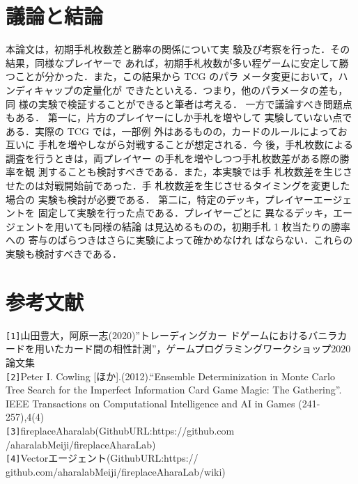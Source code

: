 \documentclass[twocolumn]{ltjsarticle}
\begin{document}
\section{議論と結論}
\small{
  本論文は，初期手札枚数差と勝率の関係について実
験及び考察を行った．その結果，同様なプレイヤーで
あれば，初期手札枚数が多い程ゲームに安定して勝
つことが分かった．また，この結果から TCG のパラ
メータ変更において，ハンディキャップの定量化が
できたといえる．つまり，他のパラメータの差も，同
様の実験で検証することができると筆者は考える．
一方で議論すべき問題点もある．
第一に，片方のプレイヤーにしか手札を増やして
実験していない点である．実際の TCG では，一部例
外はあるものの，カードのルールによってお互いに
手札を増やしながら対戦することが想定される．今
後，手札枚数による調査を行うときは，両プレイヤー
の手札を増やしつつ手札枚数差がある際の勝率を観
測することも検討すべきである．また，本実験では手
札枚数差を生じさせたのは対戦開始前であった．手
札枚数差を生じさせるタイミングを変更した場合の
実験も検討が必要である．
第二に，特定のデッキ，プレイヤーエージェントを
固定して実験を行った点である．プレイヤーごとに
異なるデッキ，エージェントを用いても同様の結論
は見込めるものの，初期手札 1 枚当たりの勝率への
寄与のばらつきはさらに実験によって確かめなけれ
ばならない．これらの実験も検討すべきである．
}
\section{
  参考文献
}
\small{
  \verb#[1]#山田豊大，阿原一志(2020)”トレーディングカー
  ドゲームにおけるバニラカードを用いたカード間の相性計測”，ゲームプログラミングワークショップ2020論文集
  \\
  \verb#[2]#Peter I. Cowling [ほか].(2012).“Ensemble
  Determinization in Monte Carlo Tree Search for the
  Imperfect Information Card Game Magic: The Gathering”.
  IEEE Transactions on Computational Intelligence and AI
  in Games (241-257),4(4)
  \\
  \verb#[3]#fireplaceAharalab(GithubURL:https://github.com
  /aharalabMeiji/fireplaceAharaLab)
  \\
  \verb#[4]#Vectorエージェント(GithubURL:https://
  github.com/aharalabMeiji/fireplaceAharaLab/wiki)
  

  
}

\end{document}
